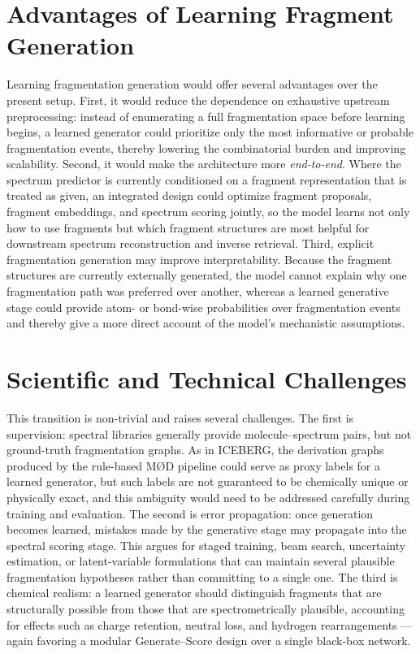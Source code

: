 \section{Advantages of Learning Fragment Generation}
Learning fragmentation generation would offer several advantages over the present setup.
First, it would reduce the dependence on exhaustive upstream preprocessing: instead of enumerating a full fragmentation space before learning begins, a learned generator could prioritize only the most informative or probable fragmentation events, thereby lowering the combinatorial burden and improving scalability.
Second, it would make the architecture more \emph{end-to-end}.
Where the spectrum predictor is currently conditioned on a fragment representation that is treated as given, an integrated design could optimize fragment proposals, fragment embeddings, and spectrum scoring jointly, so the model learns not only how to use fragments but which fragment structures are most helpful for downstream spectrum reconstruction and inverse retrieval.
Third, explicit fragmentation generation may improve interpretability.
Because the fragment structures are currently externally generated, the model cannot explain why one fragmentation path was preferred over another, whereas a learned generative stage could provide atom- or bond-wise probabilities over fragmentation events and thereby give a more direct account of the model's mechanistic assumptions.


\section{Scientific and Technical Challenges}
This transition is non-trivial and raises several challenges.
The first is supervision: spectral libraries generally provide molecule--spectrum pairs, but not ground-truth fragmentation graphs.
As in ICEBERG, the derivation graphs produced by the rule-based M\O D pipeline could serve as proxy labels for a learned generator, but such labels are not guaranteed to be chemically unique or
physically exact, and this ambiguity would need to be addressed carefully during training and evaluation.
The second is error propagation: once generation becomes learned, mistakes made by the generative stage may propagate into the spectral scoring stage.
This argues for staged training, beam search, uncertainty estimation, or latent-variable formulations that can maintain several plausible fragmentation hypotheses rather than committing to a single one.
The third is chemical realism: a learned generator should distinguish fragments that are structurally possible from those that are spectrometrically plausible, accounting for effects such as charge retention, neutral loss, and hydrogen rearrangements --- again favoring a modular Generate--Score design over a single black-box network.


